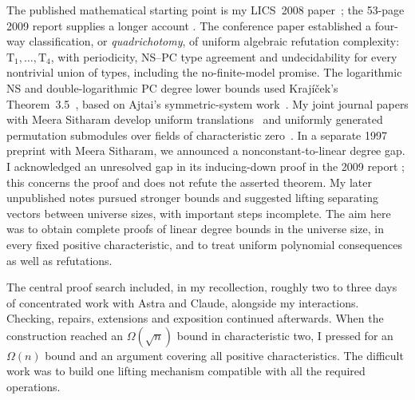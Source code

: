 The published mathematical starting point is my LICS~2008
paper~\cite{Riis}; the 53-page 2009 report supplies a longer account
\cite{RiisLong}. The conference paper established a four-way
classification, or \emph{quadrichotomy}, of uniform algebraic
refutation complexity: $\mathrm T_1,\ldots,\mathrm T_4$, with
periodicity, NS--PC type agreement and undecidability for every
nontrivial union of types, including the no-finite-model promise.
The logarithmic NS and double-logarithmic PC degree lower bounds used
Kraj\'i\v cek's Theorem~3.5~\cite{Krajicek}, based on Ajtai's
symmetric-system work~\cite{Ajtai}.
My joint journal papers with Meera Sitharam develop uniform
translations~\cite{RiisSitharamTautologies} and uniformly generated
permutation submodules over fields of characteristic
zero~\cite{RiisSitharamModules}. In a separate 1997 preprint with Meera Sitharam, we announced
a nonconstant-to-linear degree gap. I acknowledged an unresolved
gap in its inducing-down proof in the 2009 report
\cite[p.~50, footnote~3; p.~53, reference~33]{RiisLong}; this concerns
the proof and does not refute the asserted theorem. My later
unpublished notes pursued stronger bounds and suggested lifting
separating vectors between universe sizes, with important steps incomplete.
The aim here was to obtain complete proofs of linear degree bounds in
the universe size, in every fixed positive characteristic, and to treat
uniform polynomial consequences as well as refutations.

The central proof search included, in my recollection, roughly two to
three days of concentrated work with Astra and Claude, alongside my
interactions. Checking, repairs, extensions and exposition continued
afterwards. When the construction reached an $\Omega(\sqrt n)$ bound in
characteristic two, I pressed for an $\Omega(n)$ bound and an argument
covering all positive characteristics. The difficult work was to build
one lifting mechanism compatible with all the required operations.

